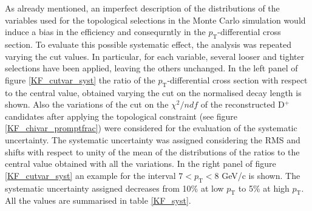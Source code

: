 \documentclass[b5paper,10pt,twoside,oldstyle,classica]{toptesi}
\newcommand{\pt}{p_\text{T}}
\begin{document}
As already mentioned, an imperfect description of the distributions of the variables used for the topological selections in the Monte Carlo simulation would induce a bias in the efficiency and consequrntly in the $\pt$-differential cross section. To evaluate this possible systematic effect, the analysis was repeated varying the cut values. In particular, for each variable, several looser and tighter selections have been applied, leaving the others unchanged. In the left panel of figure \ref{KF_cutvar_syst} the ratio of the $\pt$-differential cross section with respect to the central value, obtained varying the cut on the normalised decay length is shown. Also the variations of the cut on the $\chi^2/ndf$ of the reconstructed D$^+$ candidates after applying the topological constraint (see figure \ref{KF_chivar_promptfrac}) were considered for the evaluation of the systematic uncertainty. The systematic uncertainty was assigned considering the RMS and shifts with respect to unity of the mean of the distributions of the ratios to the central value obtained with all the variations. In the right panel of figure \ref{KF_cutvar_syst} an example for the interval $7<\pt<8$ GeV/c is shown. The systematic uncertainty assigned decreases from 10\% at low $\pt$ to 5\% at high $\pt$. All the values are summarised in table \ref{KF_syst}. 
\end{document}
